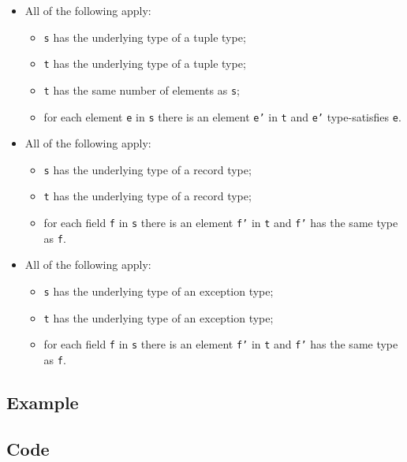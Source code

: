 \documentclass{book}
\begin{document}
\begin{itemize}
  \item All of the following apply:
    \begin{itemize}
    \item \texttt{s} has the underlying type of a tuple type;
    \item \texttt{t} has the underlying type of a tuple type;
    \item \texttt{t} has the same number of elements as \texttt{s};
    \item for each element \texttt{e} in \texttt{s} there is an element \texttt{e'} in \texttt{t} and \texttt{e'}
      type-satisfies \texttt{e}.
    \end{itemize}

  \item All of the following apply:
    \begin{itemize}
    \item \texttt{s} has the underlying type of a record type;
    \item \texttt{t} has the underlying type of a record type;
    \item for each field \texttt{f} in \texttt{s} there is an element \texttt{f'} in \texttt{t} and \texttt{f'} has
      the same type as \texttt{f}.
    \end{itemize}

  \item All of the following apply:
    \begin{itemize}
    \item \texttt{s} has the underlying type of an exception type;
    \item \texttt{t} has the underlying type of an exception type;
    \item for each field \texttt{f} in \texttt{s} there is an element \texttt{f'} in \texttt{t} and \texttt{f'} has
      the same type as \texttt{f}.
    \end{itemize}
  \end{itemize}

  \subsection{Example}

  \subsection{Code}
\end{document}
